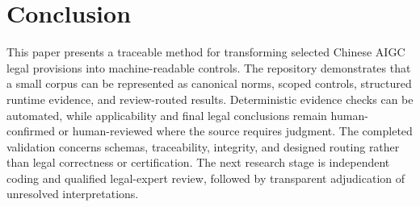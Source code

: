 \documentclass[10pt,journal]{IEEEtran}
\begin{document}
\section{Conclusion}

This paper presents a traceable method for transforming selected Chinese AIGC legal provisions into machine-readable controls. The repository demonstrates that a small corpus can be represented as canonical norms, scoped controls, structured runtime evidence, and review-routed results. Deterministic evidence checks can be automated, while applicability and final legal conclusions remain human-confirmed or human-reviewed where the source requires judgment. The completed validation concerns schemas, traceability, integrity, and designed routing rather than legal correctness or certification. The next research stage is independent coding and qualified legal-expert review, followed by transparent adjudication of unresolved interpretations.

\balance


\end{document}
